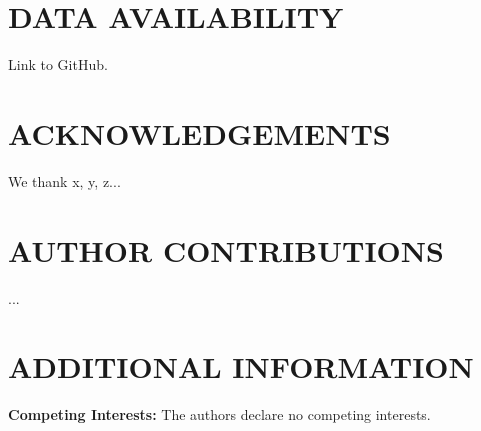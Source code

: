 \documentclass[prd,twocolumn,tightenlines,preprintnumbers,showpacs,superscriptaddress,notitlepage,nofootinbib,eqsecnum,floatfix,longbibliography]{revtex4}
\begin{document}
\section{DATA AVAILABILITY}
	
Link to GitHub.

\section{ACKNOWLEDGEMENTS}

We thank x, y, z...

\section{AUTHOR CONTRIBUTIONS}

...

\section{ADDITIONAL INFORMATION}

\textbf{Competing Interests:} The authors declare no competing interests.


\end{document}
